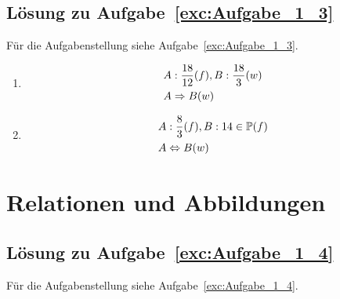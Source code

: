 \subsection{Lösung zu Aufgabe~\ref{exc:Aufgabe_1_3}}
Für die Aufgabenstellung siehe Aufgabe~\vref{exc:Aufgabe_1_3}.
\label{loe:Aufgabe_1_3}
\begin{enumerate}
\item \begin{align*}
	&A: \frac{18}{12} (f), B: \frac{18}{3} (w)\\
	&A \Rightarrow B (w)
	\end{align*}

\item \begin{align*}
	&A: \frac{8}{3} (f), B: 14 \in \mathbb{P} (f)\\
	&A \Leftrightarrow B (w)
	\end{align*}
\end{enumerate}

\section{Relationen und Abbildungen}
\subsection{Lösung zu Aufgabe~\ref{exc:Aufgabe_1_4}}
Für die Aufgabenstellung siehe Aufgabe~\vref{exc:Aufgabe_1_4}.
\label{loe:Aufgabe_1_4}

